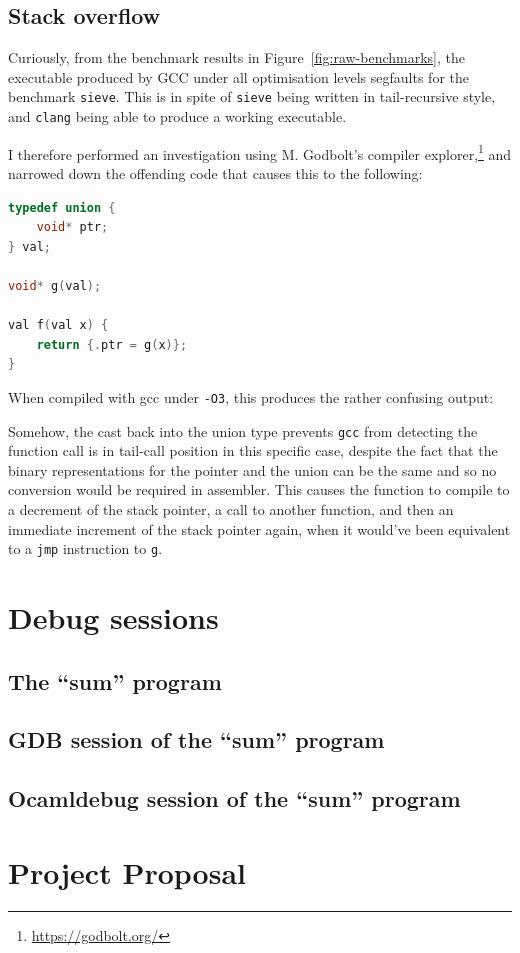 \section{Stack overflow}\label{stack-overflow}

Curiously, from the benchmark results in Figure~\ref{fig:raw-benchmarks}, the
executable produced by GCC under all optimisation levels segfaults for the
benchmark \texttt{sieve}. This is in spite of \texttt{sieve} being written in
tail-recursive style, and \texttt{clang} being able to produce a working
executable.

I therefore performed an investigation using M. Godbolt's compiler
explorer,\footnote{\url{https://godbolt.org/}} and narrowed down the offending
code that causes this to the following: 

\begin{lstlisting}[language=C]
typedef union {
    void* ptr;
} val;

void* g(val);

val f(val x) {
    return {.ptr = g(x)};
}
\end{lstlisting}

When compiled with gcc under \texttt{-O3}, this produces the rather confusing
output:



Somehow, the cast back into the union type prevents \texttt{gcc} from detecting 
the function call is in tail-call position in this specific case, despite the 
fact that the binary representations for the pointer and the union can be the
same and so no conversion would be required in assembler. This causes the
function to compile to a decrement of the stack pointer, a call to another
function, and then an immediate increment of the stack pointer again, when it
would've been equivalent to a \texttt{jmp} instruction to \texttt{g}.


\chapter{Debug sessions}\label{debug-sessions}

\section{The ``sum'' program}



\section{GDB session of the ``sum'' program}\label{debug-gdb}



\section{Ocamldebug session of the ``sum'' program}\label{debug-ocaml}



\chapter{Project Proposal}


